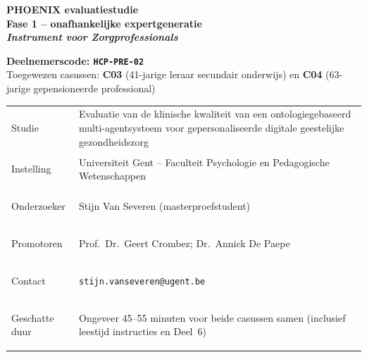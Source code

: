 \documentclass[11pt,a4paper]{article}
\renewcommand{\arraystretch}{1.28}
\begin{document}
\thispagestyle{fancy}
\vspace*{0.3cm}

\begin{tcolorbox}[
  colback=DarkBlue,colframe=DarkBlue,
  arc=3mm,left=14pt,right=14pt,top=12pt,bottom=12pt,
  width=\textwidth
]
\centering
{\fontsize{22}{28}\selectfont\bfseries\color{white}
PHOENIX evaluatiestudie\\[0.3em]
\fontsize{15}{20}\selectfont\color{AccentBlue}
Fase 1 -- onafhankelijke expertgeneratie\\[0.2em]
\fontsize{12}{16}\selectfont\color{white}
\textit{Instrument voor Zorgprofessionals}
}
\end{tcolorbox}

\vspace{0.6cm}

\begin{center}
\begin{tcolorbox}[
  colback=AccentBlue,colframe=PrimaryBlue,
  arc=2.5mm,boxrule=1.2pt,left=12pt,right=12pt,top=10pt,bottom=10pt,
  width=0.86\textwidth
]
\centering
{\large\bfseries\color{DarkBlue}Deelnemerscode: \texttt{HCP-PRE-02}}\\[0.5em]
{\normalsize\color{SlateMid}
Toegewezen casussen:\quad
\textbf{\color{PrimaryBlue}C03} (41-jarige leraar secundair onderwijs)
\quad en \quad
\textbf{\color{PrimaryBlue}C04} (63-jarige gepensioneerde professional)
}
\end{tcolorbox}
\end{center}

\vspace{0.5cm}

\begin{center}
\begin{tcolorbox}[
  colback=SoftBG,colframe=BorderGrey,
  arc=2mm,left=10pt,right=10pt,top=9pt,bottom=9pt,
  width=0.92\textwidth
]
\small\renewcommand{\arraystretch}{1.28}
\begin{tabularx}{\textwidth}{@{}>{\bfseries\raggedright\arraybackslash}p{}X@{}}
Studie & Evaluatie van de klinische kwaliteit van een ontologiegebaseerd multi-agentsysteem voor gepersonaliseerde digitale geestelijke gezondheidszorg \\
Instelling & Universiteit Gent -- Faculteit Psychologie en Pedagogische Wetenschappen \\
Onderzoeker & Stijn Van Severen (masterproefstudent) \\
Promotoren & Prof.\ Dr.\ Geert Crombez; Dr.\ Annick De Paepe \\
Contact & \texttt{stijn.vanseveren@ugent.be} \\
Geschatte duur & Ongeveer 45--55 minuten voor beide casussen samen (inclusief leestijd instructies en Deel~6) \\
\end{tabularx}
\end{tcolorbox}
\end{center}
\end{document}
